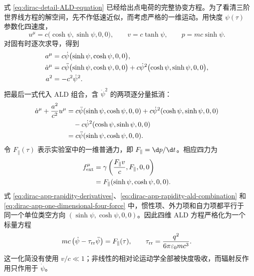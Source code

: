 式 \eqref{eq:dirac-detail-ALD-equation} 已经给出点电荷的完整协变方程。为了看清三阶世界线方程的解空间，先不作低速近似，而考虑严格的一维运动。用快度 $\psi(\tau)$ 参数化四速度，
\begin{equation}
 u^\mu=c\bigl(\cosh\psi,\sinh\psi,0,0\bigr),
 \qquad
 v=c\tanh\psi,
 \qquad
 p=mc\sinh\psi.
 \label{eq:dirac-app-rapidity-definition}
\end{equation}
对固有时逐次求导，得到
\begin{align}
 a^\mu
 &=c\dot\psi\bigl(\sinh\psi,\cosh\psi,0,0\bigr),
 \notag\\
 \dot a^\mu
 &=c\ddot\psi\bigl(\sinh\psi,\cosh\psi,0,0\bigr)
 +c\dot\psi^2\bigl(\cosh\psi,\sinh\psi,0,0\bigr),
 \notag\\
 a^2&=-c^2\dot\psi^2.
 \label{eq:dirac-app-rapidity-derivatives}
\end{align}
把最后一式代入 ALD 组合，含 $\dot\psi^2$ 的两项逐分量抵消：
\begin{align}
 \dot a^\mu+{a^2\over c^2}u^\mu
 &={}c\ddot\psi(\sinh\psi,\cosh\psi,0,0)
 +c\dot\psi^2(\cosh\psi,\sinh\psi,0,0)
 \notag\\
 &\quad
 -c\dot\psi^2(\cosh\psi,\sinh\psi,0,0)
 \notag\\
 &=c\ddot\psi(\sinh\psi,\cosh\psi,0,0).
 \label{eq:dirac-app-rapidity-ald-combination}
\end{align}
令 $F_\parallel(\tau)$ 表示实验室中的一维普通力，即 $F_\parallel=\d p/\d t$。相应四力为
\begin{align}
 f_{\mathrm{ext}}^\mu
 &=\gamma\left({F_\parallel v\over c},F_\parallel,0,0\right)
 \notag\\
 &=F_\parallel(\sinh\psi,\cosh\psi,0,0).
 \label{eq:dirac-app-one-dimensional-four-force}
\end{align}
式 \eqref{eq:dirac-app-rapidity-derivatives}、\eqref{eq:dirac-app-rapidity-ald-combination} 和 \eqref{eq:dirac-app-one-dimensional-four-force} 中，惯性项、外力项和自力项都平行于同一个单位类空方向 $(\sinh\psi,\cosh\psi,0,0)$。因此四维 ALD 方程严格化为一个标量方程
\begin{equation}
 mc\left(\dot\psi-\tau_{\mathrm{rr}}\ddot\psi\right)
 =F_\parallel(\tau),
 \qquad
 \tau_{\mathrm{rr}}={q^2\over6\pi\varepsilon_0mc^3}.
 \label{eq:dirac-app-rapidity-equation}
\end{equation}
这一化简没有使用 $v/c\ll1$；非线性的相对论运动学全部被快度吸收，而辐射反作用只作用于 $\dot\psi$。

